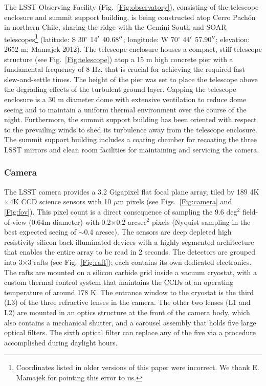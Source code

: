 The LSST Observing Facility (Fig.~\ref{Fig:observatory}),
consisting of the telescope enclosure and summit support building, is being constructed atop Cerro Pach\'{o}n in northern Chile,
sharing the ridge with the Gemini South and SOAR telescopes\footnote{Coordinates listed in older versions
of this paper were incorrect. We thank E. Mamajek for pointing this error to us.}
(latitude: S 30$^\circ$ 14$\mbox{$^\prime$}$ 40.68$\mbox{$^{\prime\prime}$}$; longitude: W 70$^\circ$ 44$\mbox{$^\prime$}$ 57.90$\mbox{$^{\prime\prime}$}$; elevation: 2652 m;
Mamajek 2012).  The telescope enclosure houses a compact, stiff
telescope structure (see Fig.~\ref{Fig:telescope}) atop a 15 m high concrete pier
with a fundamental frequency of 8 Hz, that is crucial for achieving the required fast slew-and-settle times.  The height of the pier was set to place the telescope above the degrading
effects of the turbulent ground layer.  Capping the telescope
enclosure is a 30 m diameter dome with extensive ventilation to reduce
dome seeing
and to maintain a uniform thermal environment over the course of the night.  Furthermore, the summit support
building has been oriented with respect to the prevailing winds to shed its turbulence away from the
telescope enclosure.  The summit support building includes a coating chamber for recoating the three LSST mirrors and
clean room facilities for maintaining and servicing the camera.




\vskip 0.2in
\subsubsection{ Camera }


The LSST camera provides a 3.2 Gigapixel flat focal plane array, tiled by 189
4K$\times$4K CCD science sensors with 10 $\mu$m pixels (see Figs.~\ref{Fig:camera}
and \ref{Fig:fov}). This pixel count is a direct consequence of sampling the
9.6 deg$^2$ field-of-view (0.64m diameter) with 0.2$\times$0.2 arcsec$^2$
pixels (Nyquist sampling in the best expected seeing of $\sim$0.4 arcsec).
The sensors are deep depleted high resistivity silicon back-illuminated devices with
a highly segmented architecture that enables the entire array to be read in 2 seconds.
The detectors are grouped into 3$\times$3 rafts (see Fig.~\ref{Fig:raft}); each
contains its own dedicated electronics. The rafts are mounted on a silicon carbide
grid inside a vacuum cryostat, with a custom thermal control system that maintains
the CCDs at an operating temperature of around 178 K. The entrance window to the
cryostat is the third (L3) of the three refractive lenses in the camera. The other
two lenses (L1 and L2) are mounted in an optics structure at the front of the camera
body, which also contains a mechanical shutter, and a carousel assembly that holds
five large optical filters. The sixth optical filter can
replace any of the five via a procedure accomplished during daylight hours.



